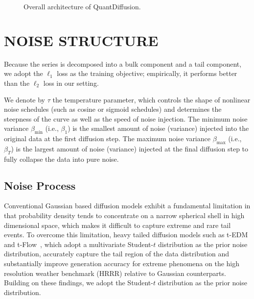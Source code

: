 \documentclass[sigconf,natbib=false]{acmart}
\begin{document}
\begin{figure}[t]

\caption{Overall architecture of QuantDiffusion.}
\label{fig:architecture}
\end{figure}



\section{NOISE STRUCTURE}
Because the series is decomposed into a bulk component and a tail component, we adopt the $\ell_1$ loss as the training objective; empirically, it performs better than the $\ell_2$ loss in our setting.

We denote by $\tau$ the temperature parameter, which controls the shape of nonlinear noise schedules (such as cosine or sigmoid schedules) and determines the steepness of the curve as well as the speed of noise injection. The minimum noise variance $\beta_{\min}$ (i.e., $\beta_1$) is the smallest amount of noise (variance) injected into the original data at the first diffusion step. The maximum noise variance $\beta_{\max}$ (i.e., $\beta_T$) is the largest amount of noise (variance) injected at the final diffusion step to fully collapse the data into pure noise.

\subsection{Noise Process}
Conventional Gaussian based diffusion models exhibit a fundamental limitation in that probability density tends to concentrate on a narrow spherical shell in high dimensional space, which makes it difficult to capture extreme and rare tail events. To overcome this limitation, heavy tailed diffusion models such as t-EDM and t-Flow~\cite{noiseprocessPandey24}, which adopt a multivariate Student-$t$ distribution as the prior noise distribution, accurately capture the tail region of the data distribution and substantially improve generation accuracy for extreme phenomena on the high resolution weather benchmark (HRRR) relative to Gaussian counterparts. Building on these findings, we adopt the Student-$t$ distribution as the prior noise distribution.
\end{document}
